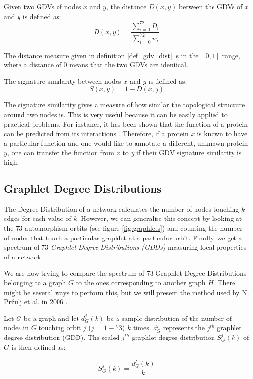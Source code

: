 \begin{mydef}
\label{def_gdv_dist}
Given two GDVs of nodes $x$ and $y$, the distance $D(x,y)$ between the GDVs of $x$ and $y$ is defined as:
$$D(x,y)= \frac{\sum_{i=0}^{72}D_i}{\sum_{i=0}^{72}w_i} $$ 
\end{mydef}

The distance measure given in definition \ref{def_gdv_dist} is in the $[0,1]$ range, where a distance of $0$ means that the two GDVs are identical. 

\begin{mydef}
\label{def_gdv_sim}
The signature similarity between nodes $x$ and $y$ is defined as:
$$S(x,y) = 1 - D(x,y) $$ 
\end{mydef}

The signature similarity gives a measure of how similar the topological structure around two nodes is. This is very useful because it can be easily applied to practical problems. For instance, it has been shown that the function of a protein can be predicted from its interactions \cite{letovsky2003predicting}. Therefore, if a protein $x$ is known to have a particular function and one would like to annotate a different, unknown protein $y$, one can transfer the function from $x$ to $y$ if their GDV signature similarity is high.

\subsection{Graphlet Degree Distributions}
\label{sec:gdd}

The Degree Distribution of a network calculates the number of nodes touching $k$
edges for each value of $k$. However, we can generalise this concept by looking
at the 73 automorphism orbits (see figure \ref{fig:graphlets}) and counting the
number of nodes that touch a particular graphlet at a particular orbit. Finally,
we get a spectrum of 73 \emph{Graphlet Degree Distributions (GDDs)} measuring
local properties of a network. 

We are now trying to compare the spectrum of 73 Graphlet Degree Distributions
belonging to a graph $G$ to the ones corresponding to another graph $H$. There
might be several ways to perform this, but we will present the method used by
N. Pr\v{z}ulj et al. in 2006 \cite{prvzulj2007biological}. 

\begin{mydef}

Let $G$ be a graph and let \( d_G^j(k) \) be a sample distribution of the
number of nodes in $G$ touching orbit $j$ ($j$ = $1-73$) $k$ times. \( d_G^j
\) represents the $j^{th}$ graphlet degree distribution (GDD). The scaled $j^{th}$ graphlet degree distribution $S_G^j(k)$ of $G$ is then defined as: 

$$ S_G^j(k) = \frac{d_G^j(k)}{k} $$

\end{mydef}


